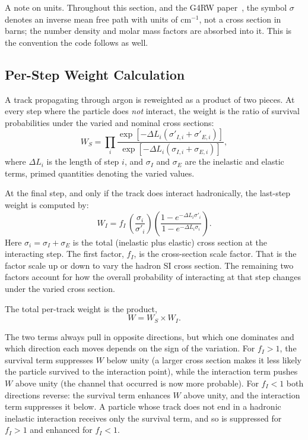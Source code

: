 \documentclass[%
article,
nofootinbib
]{revtex4-2}
\begin{document}
A note on units. Throughout this section, and the G4RW
paper~\cite{g4rw_paper}, the symbol $\sigma$ denotes an inverse mean free
path with units of cm$^{-1}$, not a cross section in barns; the number
density and molar mass factors are absorbed into it. This is the convention
the code follows as well.

\subsection{\label{subsec:weight_calc}Per-Step Weight Calculation}

A track propagating through argon is reweighted as a product of two pieces. At
every step where the particle does \emph{not} interact, the weight is the ratio
of survival probabilities under the varied and nominal cross sections:
\begin{equation}
\label{eq:ws}
    W_S = \prod_i
    \frac{\exp\!\left[-\Delta L_i\left(\sigma'_{I,i} + \sigma'_{E,i}\right)\right]}
         {\exp\!\left[-\Delta L_i\left(\sigma_{I,i} + \sigma_{E,i}\right)\right]},
\end{equation}
where $\Delta L_i$ is the length of step $i$, and $\sigma_{I}$ and $\sigma_{E}$
are the inelastic and elastic terms, primed quantities denoting the varied
values. 

At the final step, and only if the track does interact hadronically, the last-step weight is computed by:
\begin{equation}
\label{eq:wi}
    W_I = f_I\,
          \left(\frac{\sigma_i}{\sigma'_i}\right)
          \left(\frac{1 - e^{-\Delta L_i \sigma'_i}}{1 - e^{-\Delta L_i \sigma_i}}\right).
\end{equation}
Here $\sigma_i = \sigma_I + \sigma_E$ is the total (inelastic plus elastic)
cross section at the interacting step. The first factor, $f_I$, is the
cross-section scale factor. That is the factor scale up or down to vary the hadron SI cross section. The remaining two factors account for how the
overall probability of interacting at that step changes under the varied
cross section.

The total per-track weight is the product,
\begin{equation}
\label{eq:wtotal}
    W = W_S \times W_I .
\end{equation}

The two terms always pull in opposite directions, but which one dominates
and which direction each moves depends on the sign of the variation. For
$f_I > 1$, the survival term suppresses $W$ below unity (a larger cross
section makes it less likely the particle survived to the interaction
point), while the interaction term pushes $W$ above unity (the channel that
occurred is now more probable). For $f_I < 1$ both directions reverse: the
survival term enhances $W$ above unity, and the interaction term suppresses
it below. A particle whose track does not end in a hadronic inelastic
interaction receives only the survival term, and so is suppressed for
$f_I > 1$ and enhanced for $f_I < 1$.
\end{document}

